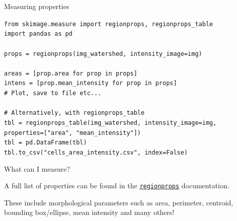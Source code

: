 \documentclass[9pt, aspectratio=169]{beamer}
\begin{document}
\begin{frame}
    {Measuring properties}
    \begin{codebox}
        \texttt{from skimage.measure import regionprops, regionprops\_table\\
        import pandas as pd\\
        \\
        props = regionprops(img\_watershed, intensity\_image=img)\\
        \\
        areas = [prop.area for prop in props]\\
        intens = [prop.mean\_intensity for prop in props]\\
        \# Plot, save to file etc...\\
        \\
        \pause
        \# Alternatively, with regionprops\_table\\
        tbl = regionprops\_table(img\_watershed, intensity\_image=img, \\
        properties=["area", "mean\_intensity"])      \\
        tbl = pd.DataFrame(tbl)\\
        tbl.to\_csv("cells\_area\_intensity.csv", index=False)
        }
    \end{codebox}
\end{frame}

\begin{frame}
    {What can I measure?}

    A full list of properties can be found in the \href{https://scikit-image.org/docs/dev/api/skimage.measure.html\#skimage.measure.regionprops}{\texttt{\underline{regionprops}}} documentation.

    These include morphological parameters such as area, perimeter, centroid, bounding box/ellipse, mean intensity and many others!
\end{frame}
\end{document}

